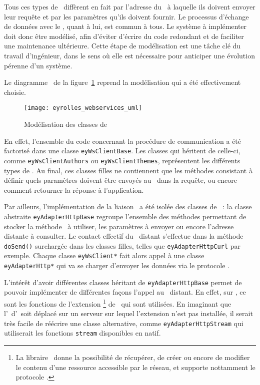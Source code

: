 Tous ces types de \aws\ diffèrent en fait par l'adresse du \alotun\ à laquelle ils doivent envoyer leur requête et par les paramètres qu'ils doivent fournir. Le processus d'échange de données avec le \alotun, quant à lui, est commun à tous. Le système à implémenter doit donc être modélisé, afin d'éviter d'écrire du code redondant et de faciliter une maintenance ultérieure. Cette étape de modélisation est une tâche clé du travail d'ingénieur, dans le sens où elle est nécessaire pour anticiper une évolution pérenne d'un système.

Le diagramme \auml\ de la figure~\ref{figure:eyrolles_webservices_uml} reprend la modélisation qui a été effectivement choisie.

\begin{figure}
	\centering
	\texttt{[image: eyrolles\_webservices\_uml]}
	\caption{Modélisation des classes de \aws}
	\label{figure:eyrolles_webservices_uml}
\end{figure}

En effet, l'ensemble du code concernant la procédure de communication a été factorisé dans une classe \texttt{eyWsClientBase}. Les classes qui héritent de celle-ci, comme \texttt{eyWsClientAuthors} ou \texttt{eyWsClientThemes}, représentent les différents types de \aws. Au final, ces classes filles ne contiennent que les méthodes consistant à définir quels paramètres doivent être envoyés au \alotun\ dans la requête, ou encore comment retourner la réponse à l'application.

Par ailleurs, l'implémentation de la liaison \ahttp\ a été isolée des classes de \aws\ : la classe abstraite \texttt{eyAdapterHttpBase} regroupe l'ensemble des méthodes permettant de stocker la méthode \ahttp\ à utiliser, les paramètres à envoyer ou encore l'adresse distante à consulter. Le contact effectif du \aws\ distant s'effectue dans la méthode \texttt{doSend()} surchargée dans les classes filles, telles que \texttt{eyAdapterHttpCurl} par exemple. Chaque classe \texttt{eyWsClient*} fait alors appel à une classe \texttt{eyAdapterHttp*} qui va se charger d'envoyer les données via le protocole \ahttp.

L'intérêt d'avoir différentes classes héritant de \texttt{eyAdapterHttpBase} permet de pouvoir implémenter de différentes façons l'appel au \aws\ distant. En effet, sur \aey, ce sont les fonctions de l'extension \acurl\footnote{La libraire \acurl\ donne la possibilité de récupérer, de créer ou encore de modifier le contenu d'une ressource accessible par le réseau, et supporte nottamment le protocole \ahttp.} de \aphp\ qui sont utilisées. En imaginant que l'\aintranet\ d'\aey\ soit déplacé sur un serveur sur lequel l'extension n'est pas installée, il serait très facile de réécrire une classe alternative, comme \texttt{eyAdapterHttpStream} qui utiliserait les fonctions \texttt{stream} disponibles en natif.


